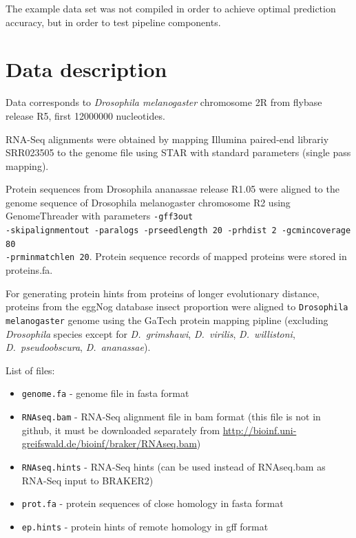 \documentclass[a4paper,10pt]{report}
\begin{document}
The example data set was not compiled in order to achieve optimal prediction accuracy, but in order to test pipeline components.

\section{Data description}

Data corresponds to \textit{Drosophila melanogaster} chromosome 2R from flybase release R5, first 12000000 nucleotides.

RNA-Seq alignments were obtained by mapping Illumina paired-end librariy SRR023505 to the genome file using STAR with standard parameters (single pass mapping).

Protein sequences from Drosophila ananassae release R1.05 were aligned to the genome sequence of
Drosophila melanogaster chromosome R2 using GenomeThreader with parameters
\texttt{-gff3out \\-skipalignmentout -paralogs -prseedlength 20 -prhdist 2 -gcmincoverage 80 \\
-prminmatchlen 20}.
Protein sequence records of mapped proteins were stored in proteins.fa. 

For generating protein hints from proteins of longer evolutionary distance, proteins from the eggNog database insect proportion were aligned to \texttt{Drosophila melanogaster} genome using the GaTech protein mapping pipline (excluding \textit{Drosophila} species except for \textit{D.~grimshawi},
\textit{D.~virilis}, \textit{D.~willistoni}, \textit{D.~pseudoobscura}, \textit{D.~ananassae}).

List of files:

\begin{itemize}
 \item \texttt{genome.fa} - genome file in fasta format
 \item \texttt{RNAseq.bam} - RNA-Seq alignment file in bam format (this file is not in github, it must be downloaded separately from \url{http://bioinf.uni-greifswald.de/bioinf/braker/RNAseq.bam})
 \item \texttt{RNAseq.hints} - RNA-Seq hints (can be used instead of RNAseq.bam as RNA-Seq input to BRAKER2)
 \item \texttt{prot.fa} - protein sequences of close homology in fasta format
 \item \texttt{ep.hints} - protein hints of remote homology in gff format
\end{itemize}
\end{document}
